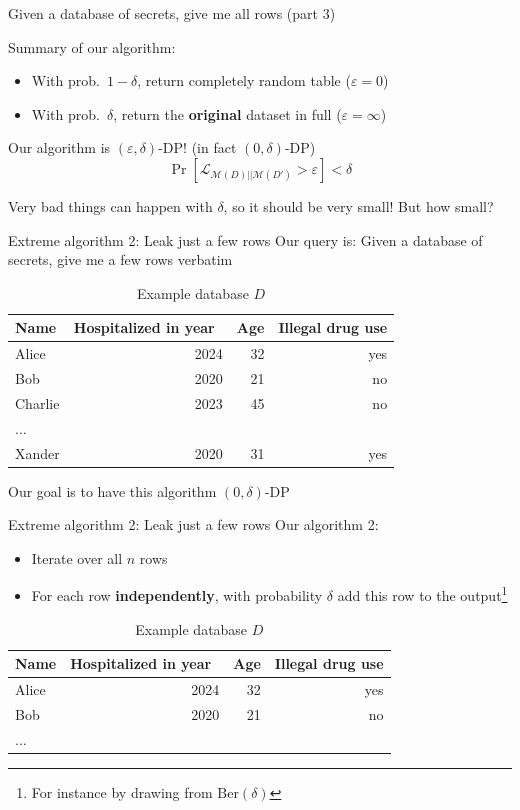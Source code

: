 \documentclass[12pt,aspectratio=169,handout]{beamer}
\begin{document}
\begin{frame}{Given a database of secrets, give me all rows (part 3)}

Summary of our algorithm:
\begin{itemize}
\item With prob.\ $1 - \delta$, return completely random table ($\varepsilon = 0$)
\item With prob.\ $\delta$, return the \textbf{original} dataset in full ($\varepsilon = \infty$)
\end{itemize}
Our algorithm is $(\varepsilon, \delta)$-DP! (in fact $(0, \delta)$-DP)
$$
\Pr\left[\mathcal{L}_{\mathcal{M}(D) || \mathcal{M}(D')} > \varepsilon \right] < \delta
$$

Very bad things can happen with $\delta$, so it should be very small! But how small?
\end{frame}



\begin{frame}{Extreme algorithm 2: Leak just a few rows}
Our query is: Given a database of secrets, give me a few rows verbatim

\begin{table}
\footnotesize
\begin{tabular}{lrrr} \toprule
Name & Hospitalized in year & Age & Illegal drug use \\ \midrule
Alice & 2024 & 32 & yes \\
Bob & 2020 & 21 & no \\
Charlie & 2023 & 45 & no \\
$\ldots$ & & & \\
Xander & 2020 & 31 & yes \\ \bottomrule
\end{tabular}
\caption{Example database $D$}
\end{table}

Our goal is to have this algorithm $(0, \delta)$-DP

\end{frame}

\begin{frame}{Extreme algorithm 2: Leak just a few rows}
Our algorithm 2:
\begin{itemize}
\item Iterate over all $n$ rows
\item For each row \textbf{independently}, with probability $\delta$ add this row to the output\footnote{For instance by drawing from $\mathrm{Ber}(\delta)$}
\end{itemize}
\begin{table}
\footnotesize
\begin{tabular}{lrrr} \toprule
Name & Hospitalized in year & Age & Illegal drug use \\ \midrule
Alice & 2024 & 32 & yes \\
Bob & 2020 & 21 & no \\
$\ldots$ & & & \\ \bottomrule
\end{tabular}
\caption{Example database $D$}
\end{table}

\end{frame}
\end{document}
